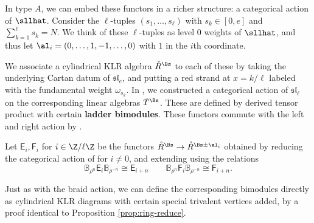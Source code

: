In type $A$, we can embed these functors in a richer structure: a categorical action of $\sllhat$.    Consider the $\ell$-tuples $(s_1,\dots, s_\ell)$ with $s_k\in [0,e]$ and $\sum_{k=1}^\ell s_k=N$.  We think of these $\ell$-tuples as level $0$ weights of $\sllhat$, and thus let $\al_i=(0,\dots, 1,-1,\dots, 0)$ with $1$ in the $i$th coordinate.  
 
We associate a cylindrical KLR algebra $\mathring{R}^{\Bs}$ to each of these by taking the underlying Cartan datum of $\mathfrak{sl}_e$, and putting a red strand at $x=k/\ell$ labeled with the fundamental weight $\omega_{s_k}$.  
In \cite[Th. 4.20]{Webweb}, we constructed a categorical action of $\mathfrak{sl}_\ell$ on the corresponding linear algebras $\tilde{T}^\Bs$.  These are defined by derived tensor product with certain {\bf ladder bimodules}.  These functors commute with the left and right action by \cite[Prop. 3.8]{Webweb}.
\begin{definition}
Let $\mathsf{E}_{i},\mathsf{F}_{i}$ for $i\in \Z/\ell\Z$ be the functors $\mathring{R}^{\Bs}\to \mathring{R}^{\Bs\pm \al_i}$ obtained by reducing the categorical action of \cite[Th. 4.20]{Webweb} for $i\neq 0$, and extending using the relations 
\[\mathbb{B}_{\rho^{n}}\mathsf{E}_{i}\mathbb{B}_{\rho^{-n}}\cong \mathsf{E}_{i+n}\qquad \mathbb{B}_{\rho^{n}}\mathsf{F}_{i}\mathbb{B}_{\rho^{-n}}\cong \mathsf{F}_{i+n}.\]
\end{definition}
Just as with the braid action, we can define the corresponding bimodules directly as cylindrical KLR diagrams with certain special trivalent vertices added, by a proof identical to Proposition \ref{prop:ring-reduce}.



